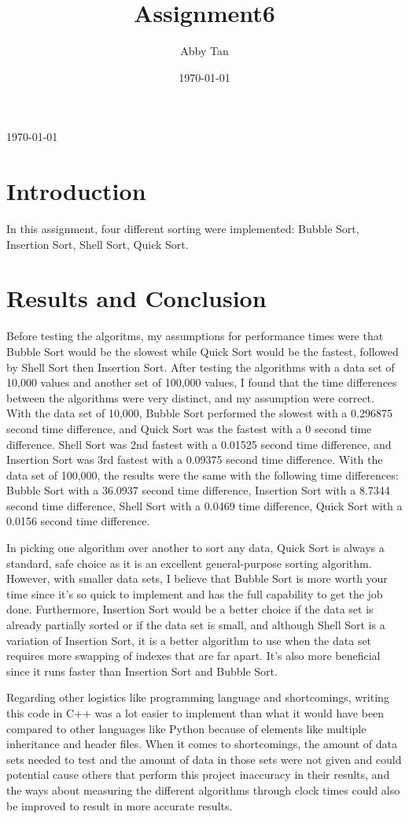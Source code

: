 \documentclass[12pt,notitlepage]{IEEEtran}
\begin{document}
\title{Assignment6}
\author{Abby Tan}
\date{\today}

\maketitle

\setlength{\parindent}{10ex}
\today
\section{Introduction}
In this assignment, four different sorting were implemented: Bubble Sort, Insertion Sort, Shell Sort, Quick Sort. 
\section{Results and Conclusion}
Before testing the algoritms, my assumptions for performance times were that Bubble Sort would be the slowest while Quick Sort would be the fastest, followed by Shell Sort then Insertion Sort. After testing the algorithms with a data set of 10,000 values and another set of 100,000 values, I found that the time differences between the algorithms were very distinct, and my assumption were correct. With the data set of 10,000, Bubble Sort performed the slowest with a 0.296875 second time difference, and Quick Sort was the fastest with a 0 second time difference. Shell Sort was 2nd fastest with a 0.01525 second time difference, and Insertion Sort was 3rd fastest with a 0.09375 second time difference. With the data set of 100,000, the results were the same with the following time differences: Bubble Sort with a 36.0937 second time difference, Insertion Sort with a 8.7344 second time difference, Shell Sort with a 0.0469 time difference, Quick Sort with a 0.0156 second time difference.
\par
In picking one algorithm over another to sort any data, Quick Sort is always a standard, safe choice as it is an excellent general-purpose sorting algorithm. However, with smaller data sets, I believe that Bubble Sort is more worth your time since it's so quick to implement and has the full capability to get the job done. Furthermore, Insertion Sort would be a better choice if the data set is already partially sorted or if the data set is small, and although Shell Sort is a variation of Insertion Sort, it is a better algorithm to use when the data set requires more swapping of indexes that are far apart. It's also more beneficial since it runs faster than Insertion Sort and Bubble Sort.
\par
Regarding other logistics like programming language and shortcomings, writing this code in C++ was a lot easier to implement than what it would have been compared to other languages like Python because of elements like multiple inheritance and header files. When it comes to shortcomings, the amount of data sets needed to test and the amount of data in those sets were not given and could potential cause others that perform this project inaccuracy in their results, and the ways about measuring the different algorithms through clock times could also be improved to result in more accurate results. 
\end{document}
